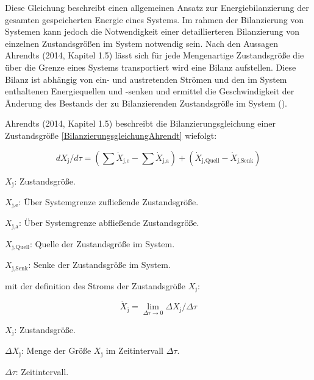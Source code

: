 Diese Gleichung beschreibt einen allgemeinen Ansatz zur Energiebilanzierung der gesamten gespeicherten Energie eines Systems. 
Im rahmen der Bilanzierung von Systemen kann jedoch die Notwendigkeit einer detaillierteren Bilanzierung von einzelnen Zustandsgrößen 
im System notwendig sein. 
Nach den Aussagen Ahrendts (2014, Kapitel 1.5) lässt sich für jede Mengenartige Zustandsgröße die über die 
Grenze eines Systems transportiert wird eine Bilanz aufstellen. 
Diese Bilanz ist abhängig von ein- und austretenden Strömen und den im System enthaltenen Energiequellen und -senken und ermittel die 
Geschwindigkeit der Änderung des Bestands der zu Bilanzierenden Zustandsgröße im System (\cite[Kapitel 1.5]{Ahrendts.2014}).

Ahrendts (2014, Kapitel 1.5) beschreibt die Bilanzierungsgleichung einer Zustandsgröße \eqref{BilanzierungsgleichungAhrendt} wiefolgt:

\begin{equation}
    dX_{\text{j}}/d\tau = (\sum \dot{X}_{\text{j,e}} - \sum \dot{X}_{\text{j,a}}) + (\dot{X}_{\text{j,Quell}} - \dot{X}_{\text{j,Senk}})
    \label{BilanzierungsgleichungAhrendt}
\end{equation}

\begin{description}
    \item \(X_{\text{j}}\): Zustandsgröße.
    \item \(X_{\text{j,e}}\): Über Systemgrenze zufließende Zustandsgröße.
    \item \(X_{\text{j,a}}\): Über Systemgrenze abfließende Zustandsgröße.
    \item \(X_{\text{j,Quell}}\): Quelle der Zustandsgröße im System.
    \item \(X_{\text{j,Senk}}\): Senke der Zustandsgröße im System.
\end{description}

mit der definition des Stroms der Zustandsgröße \(X_{\text{j}}\):

\begin{equation}
    \dot{X}_{\text{j}} = \lim_{\Delta\tau \to 0} \Delta X_{\text{j}}/ \Delta\tau
    \label{BilanzierungsgleichungAhrendtStrom}
\end{equation}

\begin{description}
    \item \(X_{\text{j}}\): Zustandsgröße.
    \item \(\Delta X_{\text{j}}\): Menge der Größe \(X_{\text{j}}\) im Zeitintervall \(\Delta \tau\).
    \item \(\Delta \tau\): Zeitintervall.
\end{description}

